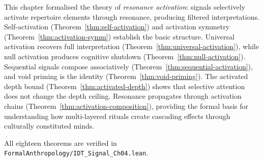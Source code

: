 This chapter formalised the theory of \emph{resonance activation}:
signals selectively activate repertoire elements through resonance,
producing filtered interpretations.  Self-activation
(Theorem~\ref{thm:self-activation}) and activation symmetry
(Theorem~\ref{thm:activation-symm}) establish the basic structure.
Universal activation recovers full interpretation
(Theorem~\ref{thm:universal-activation}), while null activation produces
cognitive shutdown (Theorem~\ref{thm:null-activation}).  Sequential
signals compose associatively
(Theorem~\ref{thm:sequential-activation}), and void priming is the
identity (Theorem~\ref{thm:void-priming}).  The activated depth bound
(Theorem~\ref{thm:activated-depth}) shows that selective attention does
not change the depth ceiling.  Resonance propagates through activation
chains (Theorem~\ref{thm:activation-composition}), providing the formal
basis for understanding how multi-layered rituals create cascading
effects through culturally constituted minds.

All eighteen theorems are verified in
\texttt{FormalAnthropology/IDT\_Signal\_Ch04.lean}.
